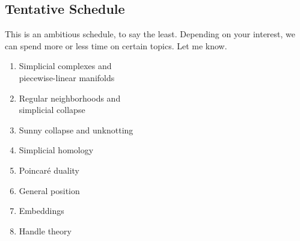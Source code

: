 \documentclass[12pt]{handout}
\begin{document}
\subsection*{Tentative Schedule}

This is an ambitious schedule, to say the least.  Depending on your
interest, we can spend more or less time on certain topics.  Let me know.

\begin{multicols}{2}
\begin{enumerate}
\item Simplicial complexes and \\ piecewise-linear manifolds
\item Regular neighborhoods and \\ simplicial collapse
\item Sunny collapse and unknotting
\item Simplicial homology
\item Poincar\'e duality
\item General position
\item Embeddings
\item Handle theory
\end{enumerate}
\end{multicols}
\end{document}
